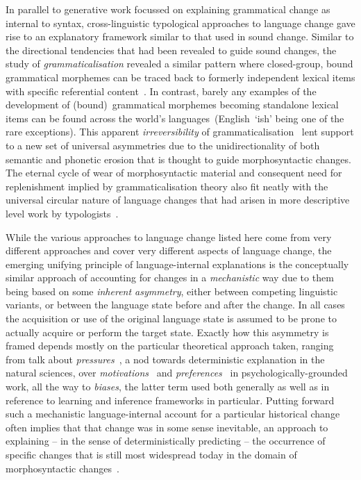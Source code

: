 In parallel to generative work focussed on explaining grammatical change as internal to syntax, cross-linguistic typological approaches to language change gave rise to an explanatory framework similar to that used in sound change. Similar to the directional tendencies that had been revealed to guide sound changes, the study of \emph{grammaticalisation} revealed a similar pattern where closed-group, bound grammatical morphemes can be traced back to formerly independent lexical items with specific referential content~\citep{Hopper1993}.
In contrast, barely any examples of the development of (bound)~grammatical morphemes becoming standalone lexical items can be found across the world's languages~(English~`ish' being one of the rare exceptions).
This apparent \emph{irreversibility} of grammaticalisation~\citep{Haspelmath2004directionality} lent support to a new set of universal asymmetries due to the unidirectionality of both semantic and phonetic erosion that is thought to guide morphosyntactic changes. The eternal cycle of wear of morphosyntactic material and consequent need for replenishment implied by grammaticalisation theory also fit neatly with the universal circular nature of language changes that had arisen in more descriptive level work by typologists~\citep{Cowgill1963,Hodge1970}.

While the various approaches to language change listed here come from very different approaches and cover very different aspects of language change, 
the emerging unifying principle of language-internal explanations is the conceptually similar approach of accounting for changes in a \emph{mechanistic} way due to them being based on some \emph{inherent asymmetry}, either between competing linguistic variants, or between the language state before and after the change. In all cases the acquisition or use of the original language state is assumed to be prone to actually acquire or perform the target state. Exactly how this asymmetry is framed depends mostly on the particular theoretical approach taken, ranging from talk about \emph{pressures}~\citep[e.g.][]{Thomsen2006}, a nod towards deterministic explanation in the natural sciences, over \emph{motivations}~\citep{MacWhinney2014} and \emph{preferences}~\citep{Fedzechkina2016} in psychologically-grounded work, all the way to \emph{biases}, the latter term used both generally as well as in reference to learning and inference frameworks in particular.
Putting forward such a mechanistic language-internal account for a particular historical change often implies that that change was in some sense inevitable, an approach to explaining -- in the sense of deterministically predicting -- the occurrence of specific changes that is still most widespread today in the domain of morphosyntactic changes~\citep{Lightfoot2010}.

